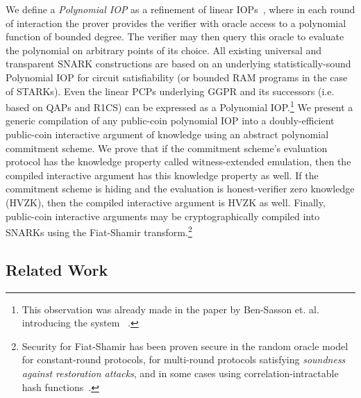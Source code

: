 We define a \emph{Polynomial IOP} as a refinement of linear IOPs~\cite{IKO07, C:BBGGI19}, where in each round of interaction the prover provides the verifier with oracle access to a polynomial function of bounded degree. The verifier may then query this oracle to evaluate the polynomial on arbitrary points of its choice. All existing universal and transparent SNARK constructions are based on an underlying statistically-sound Polynomial IOP for circuit satisfiability (or bounded RAM programs in the case of STARKs). Even the linear PCPs underlying GGPR and its successors (i.e. based on QAPs and R1CS) can be expressed as a Polynomial IOP.\footnote{This observation was already made in the paper by Ben-Sasson et. al. introducing the system ~\cite{EC:BCRSVW19}.} We present a generic compilation of any public-coin polynomial IOP into a doubly-efficient public-coin interactive argument of knowledge using an abstract polynomial commitment scheme. We prove that if the commitment scheme's evaluation protocol has the knowledge property called witness-extended emulation, then the compiled interactive argument has this knowledge property as well. If the commitment scheme is hiding and the evaluation is honest-verifier zero knowledge (HVZK), then the compiled interactive argument is HVZK as well. Finally, public-coin interactive arguments may be cryptographically compiled into SNARKs using the Fiat-Shamir transform.\footnote{Security for Fiat-Shamir has been proven secure in the random oracle model for constant-round protocols, for multi-round protocols satisfying \emph{soundness against restoration attacks}, and in some cases using correlation-intractable hash functions~\cite{C:FiaSha86,CCS:BelRog93,EC:PoiSte96,CSproofs,TCC:HalMyeRac08,TCC:BenChiSpo16,EC:AABN02,C:KalRotRot17,EC:CCRR18,FOCS:HolLom18,STOC:CCHLRRW19}.}

\subsection{Related Work}

